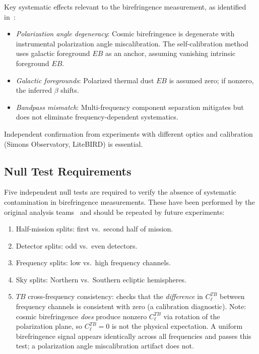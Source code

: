 \documentclass[aps,prd,twocolumn,superscriptaddress,showpacs,preprintnumbers,nofootinbib,longbibliography,floatfix]{revtex4-2}
\begin{document}
Key systematic effects relevant to the birefringence measurement, as identified in~\cite{Minami2020,Eskilt2022}:
\begin{itemize}[leftmargin=*]
\item \textit{Polarization angle degeneracy}: Cosmic birefringence is degenerate with instrumental polarization angle miscalibration. The self-calibration method uses galactic foreground $EB$ as an anchor, assuming vanishing intrinsic foreground $EB$.
\item \textit{Galactic foregrounds}: Polarized thermal dust $EB$ is assumed zero; if nonzero, the inferred $\beta$ shifts.
\item \textit{Bandpass mismatch}: Multi-frequency component separation mitigates but does not eliminate frequency-dependent systematics.
\end{itemize}

Independent confirmation from experiments with different optics and calibration (Simons Observatory, LiteBIRD) is essential.

\subsection{Null Test Requirements}

Five independent null tests are required to verify the absence of systematic contamination in birefringence measurements. These have been performed by the original analysis teams~\cite{Minami2020,Eskilt2022} and should be repeated by future experiments:
\begin{enumerate}[leftmargin=*]
\item Half-mission splits: first vs.\ second half of mission.
\item Detector splits: odd vs.\ even detectors.
\item Frequency splits: low vs.\ high frequency channels.
\item Sky splits: Northern vs.\ Southern ecliptic hemispheres.
\item $TB$ cross-frequency consistency: checks that the \textit{difference} in $C_\ell^{TB}$ between frequency channels is consistent with zero (a calibration diagnostic). Note: cosmic birefringence \textit{does} produce nonzero $C_\ell^{TB}$ via rotation of the polarization plane, so $C_\ell^{TB} = 0$ is not the physical expectation. A uniform birefringence signal appears identically across all frequencies and passes this test; a polarization angle miscalibration artifact does not.
\end{enumerate}
\end{document}
